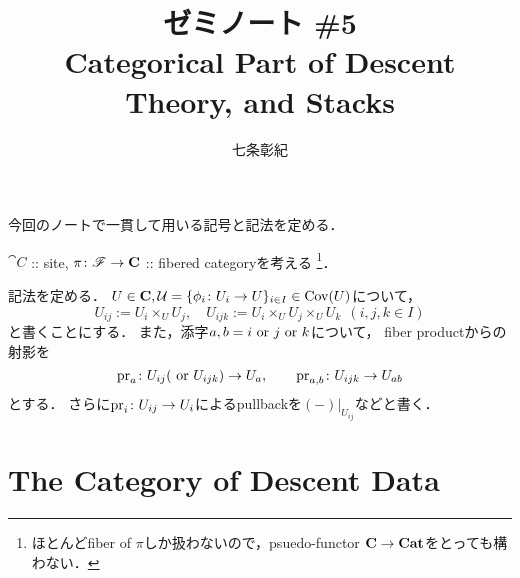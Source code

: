 \documentclass[a4paper]{jsarticle}
\begin{document}
\title{ゼミノート \#5 \\ Categorical Part of Descent Theory, and Stacks}
\author{七条彰紀}
\maketitle

今回のノートで一貫して用いる記号と記法を定める．

$\cat{C}$ :: site, 
$\pi \colon \mathscr{F} \to \mathbf{C}$ :: fibered categoryを考える
\footnote{ ほとんどfiber of $\pi$しか扱わないので，psuedo-functor $\mathbf{C} \to \mathbf{Cat}$をとっても構わない． }．

記法を定める．
$U \in \mathbf{C}, \mathcal{U}=\{\phi_i \colon U_i \to U\}_{i \in I} \in \operatorname{Cov}(U)$について，
\[ U_{ij}:=U_i \times_U U_j, \quad U_{ijk}:=U_i \times_U U_j \times_U U_k \ \ (i,j,k \in I) \]
と書くことにする．
また，添字$a,b=i \text{ or } j \text{ or } k$について，
fiber productからの射影を
\[ \operatorname{pr}_{a} \colon U_{ij} (\text{ or } U_{ijk}) \to U_{a}, \qquad \operatorname{pr}_{a,b} \colon U_{ijk} \to U_{ab} \]
とする．
さらに$\operatorname{pr}_{i} \colon U_{ij} \to U_{i}$によるpullbackを$(-)|_{U_{ij}}$などと書く．

\section{The Category of Descent Data}
\end{document}
